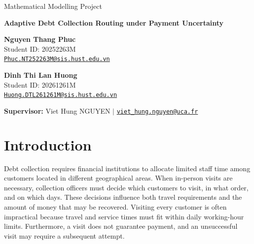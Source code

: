 \documentclass[11pt,a4paper]{article}
\begin{document}
\begin{center}
\setlength{\parskip}{0pt}

{\small Mathematical Modelling Project\par}
\vspace{0.2cm}

{\Large\bfseries
Adaptive Debt Collection Routing under Payment Uncertainty\par}

\vspace{0.3cm}

\begin{minipage}[t]{0.48\textwidth}
\centering
\textbf{Nguyen Thang Phuc}\\[2pt]
{\small Student ID: 20252263M}\\[2pt]
\href{mailto:Phuc.NT252263M@sis.hust.edu.vn}
{\scriptsize\texttt{Phuc.NT252263M@sis.hust.edu.vn}}
\end{minipage}
\hfill
\begin{minipage}[t]{0.48\textwidth}
\centering
\textbf{Dinh Thi Lan Huong}\\[2pt]
{\small Student ID: 20261261M}\\[2pt]
\href{mailto:Huong.DTL261261M@sis.hust.edu.vn}
{\scriptsize\texttt{Huong.DTL261261M@sis.hust.edu.vn}}
\end{minipage}

\vspace{0.25cm}

{\small
\textbf{Supervisor:} Viet Hung NGUYEN
\enspace$\vert$\enspace
\href{mailto:viet_hung.nguyen@uca.fr}
{\texttt{viet\_hung.nguyen@uca.fr}}
\par}
\end{center}

\section{Introduction}
\label{sec:introduction}

Debt collection requires financial institutions to allocate limited
staff time among customers located in different geographical areas.
When in-person visits are necessary, collection officers must decide
which customers to visit, in what order, and on which days. These
decisions influence both travel requirements and the amount of money
that may be recovered. Visiting every customer is often impractical
because travel and service times must fit within daily working-hour
limits. Furthermore, a visit does not guarantee payment, and an
unsuccessful visit may require a subsequent attempt.
\end{document}
